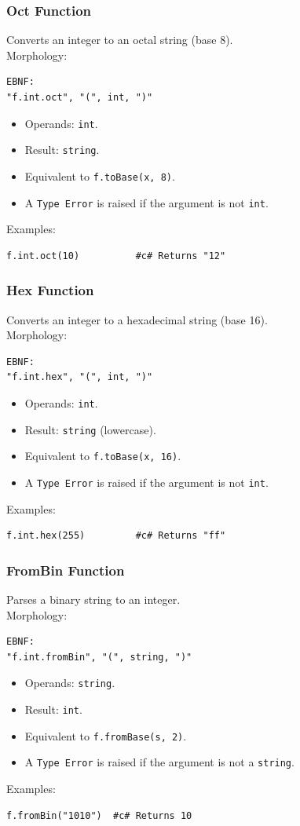 \subsubsection{Oct Function}
Converts an integer to an octal string (base 8). \\
Morphology:
\begin{verbatim}
EBNF:
"f.int.oct", "(", int, ")"
\end{verbatim}
\begin{itemize}
\item Operands: \texttt{int}.
\item Result: \texttt{string}.
\item Equivalent to \texttt{f.toBase(x, 8)}.
\item A \texttt{Type Error} is raised if the argument is not \texttt{int}.
\end{itemize}
Examples:
\begin{verbatim}
f.int.oct(10)          #c# Returns "12"
\end{verbatim}

\subsubsection{Hex Function}
Converts an integer to a hexadecimal string (base 16). \\
Morphology:
\begin{verbatim}
EBNF:
"f.int.hex", "(", int, ")"
\end{verbatim}
\begin{itemize}
\item Operands: \texttt{int}.
\item Result: \texttt{string} (lowercase).
\item Equivalent to \texttt{f.toBase(x, 16)}.
\item A \texttt{Type Error} is raised if the argument is not \texttt{int}.
\end{itemize}
Examples:
\begin{verbatim}
f.int.hex(255)         #c# Returns "ff"
\end{verbatim}

\subsubsection{FromBin Function}
Parses a binary string to an integer. \\
Morphology:
\begin{verbatim}
EBNF:
"f.int.fromBin", "(", string, ")"
\end{verbatim}
\begin{itemize}
\item Operands: \texttt{string}.
\item Result: \texttt{int}.
\item Equivalent to \texttt{f.fromBase(s, 2)}.
\item A \texttt{Type Error} is raised if the argument is not a \texttt{string}.
\end{itemize}
Examples:
\begin{verbatim}
f.fromBin("1010")  #c# Returns 10
\end{verbatim}

